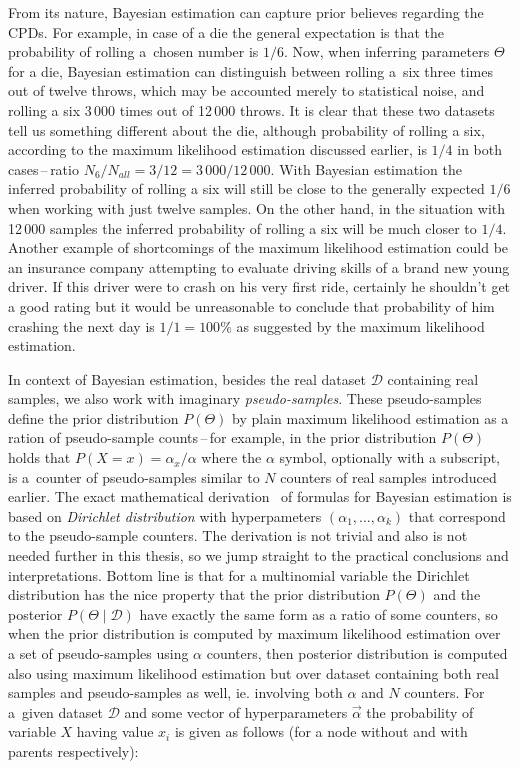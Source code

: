 \documentclass[english,cover]{fitthesis} %
\newcommand{\term}[1]{\emph{#1}}           %
\begin{document}
From its nature, Bayesian estimation can capture prior believes regarding the CPDs. For example, in case of a die the general expectation is that the probability of rolling a~chosen number is $1/6$. Now, when inferring parameters $\Theta$ for a die, Bayesian estimation can distinguish between rolling a~six three times out of twelve throws, which may be accounted merely to statistical noise, and rolling a six 3\,000 times out of 12\,000 throws. It is clear that these two datasets tell us something different about the die, although probability of rolling a six, according to the maximum likelihood estimation discussed earlier, is $1/4$ in both cases\,--\,ratio $N_6 / N_{all} = 3/12 = 3\,000/12\,000$. With Bayesian estimation the inferred probability of rolling a six will still be close to the generally expected $1/6$ when working with just twelve samples. On the other hand, in the situation with 12\,000 samples the inferred probability of rolling a six will be much closer to $1/4$. Another example of shortcomings of the maximum likelihood estimation could be an insurance company attempting to evaluate driving skills of a brand new young driver. If this driver were to crash on his very first ride, certainly he shouldn't get a good rating but it would be unreasonable to conclude that probability of him crashing the next day is $1/1 = 100 \%$ as suggested by the maximum likelihood estimation.

In context of Bayesian estimation, besides the real dataset $\mathcal{D}$ containing real samples, we also work with imaginary \term{pseudo-samples}. These pseudo-samples define the prior distribution $P(\Theta)$ by plain maximum likelihood estimation as a ration of pseudo-sample counts\,--\,for example, in the prior distribution $P(\Theta)$ holds that $P(X = x) = \alpha_x / \alpha$ where the $\alpha$ symbol, optionally with a subscript, is a~counter of pseudo-samples similar to $N$ counters of real samples introduced earlier. The exact mathematical derivation~\cite[p.~733]{pgm} of formulas for Bayesian estimation is based on \term{Dirichlet distribution} with hyperpameters $(\alpha_1,\dots,\alpha_k)$ that correspond to the pseudo-sample counters. The derivation is not trivial and also is not needed further in this thesis, so we jump straight to the practical conclusions and interpretations. Bottom line is that for a multinomial variable the Dirichlet distribution has the nice property that the prior distribution $P(\Theta)$ and the posterior $P(\Theta \mid \mathcal{D})$ have exactly the same form as a ratio of some counters, so when the prior distribution is computed by maximum likelihood estimation over a set of pseudo-samples using $\alpha$ counters, then posterior distribution is computed also using maximum likelihood estimation but over dataset containing both real samples and pseudo-samples as well, ie. involving both $\alpha$ and $N$ counters. For a~given dataset $\mathcal{D}$ and some vector of hyperparameters $\vec{\alpha}$ the probability of variable $X$ having value $x_i$ is given as follows (for a node without and with parents respectively):
\end{document}
